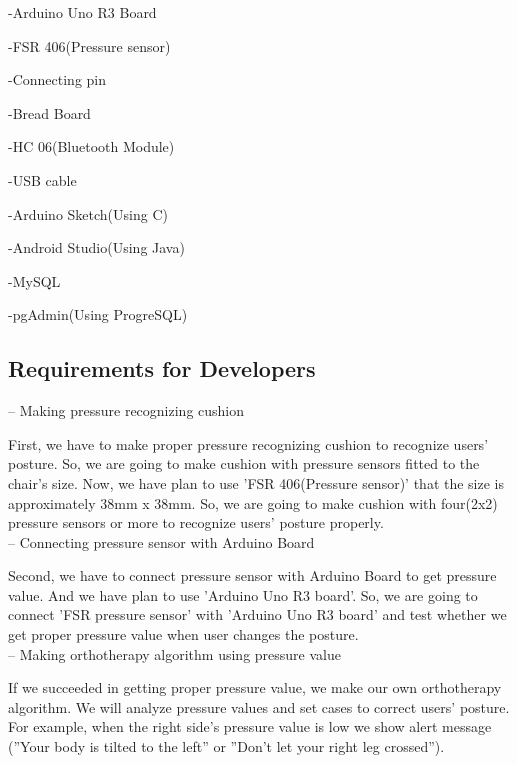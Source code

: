 \documentclass[conference]{IEEEtran}
\begin{document}

-Arduino Uno R3 Board

-FSR 406(Pressure sensor)

-Connecting pin

-Bread Board

-HC 06(Bluetooth Module)

-USB cable

-Arduino Sketch(Using C)

-Android Studio(Using Java)

-MySQL

-pgAdmin(Using ProgreSQL)\\


\subsection{Requirements for Developers}

-- Making pressure recognizing cushion

First, we have to make proper pressure recognizing cushion to recognize users' posture. So, we are going to make cushion with pressure sensors fitted to the chair's size. Now, we have plan to use 'FSR 406(Pressure sensor)' that the size is approximately 38mm x 38mm. So, we are going to make cushion with four(2x2) pressure sensors or more to recognize users' posture properly.   \\

-- Connecting  pressure sensor with Arduino Board

Second, we have to connect pressure sensor with Arduino Board to get pressure value. And we have plan to use 'Arduino Uno R3 board'. So, we are going to connect 'FSR pressure sensor' with 'Arduino Uno R3 board' and test whether we get proper pressure value when user changes the posture. \\

-- Making orthotherapy algorithm using pressure value

If we succeeded in getting proper pressure value, we make our own orthotherapy algorithm. We will analyze pressure values and set cases to correct users' posture. For example, when the right side's pressure value is low we show alert message (''Your body is tilted to the left'' or ''Don't let your right leg crossed''). \\
\end{document}
